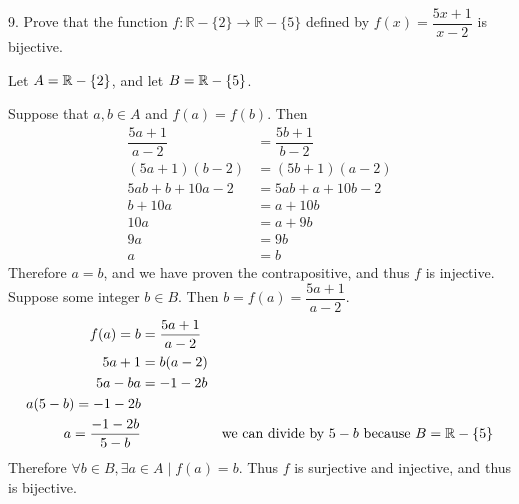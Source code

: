 \documentclass{idrisMemo}
\begin{document}
\begin{prooflist}{9. Prove that the function $f: \mathbb{R}-\{2\} \rightarrow
    \mathbb{R}-\{5\}$ defined by $f(x)=\dfrac{5 x+1}{x-2}$ is bijective.}
\inj{}
\item Let $A=\mathbb{R}-\{2\}$, and let $B=\mathbb{R}-\{5\}$.
\item Suppose that $a, b\in A$ and $f(a)=f(b)$. Then
    \begin{align*}
        \dfrac{5 a+1}{a-2}&=\dfrac{5 b+1}{b-2}\\
    (5 a+1)(b-2)&=(5 b+1)(a-2)\\
    5ab+b+10a-2&= 5ab+a+10b-2\\
    b+10a&= a+10b\\
    10a&= a+9b\\
    9a&= 9b\\
    a&=b
    \end{align*}
Therefore $a=b$, and we have proven the contrapositive, and thus $f$ is injective.
\surj{}
Suppose some integer $b\in B$. Then $b = f(a) = \dfrac{5a+1}{a-2}$.
    \begin{align*}
        f(a) = b &= \dfrac{5a+1}{a-2}\\
        5a+1 &= b(a-2)\\
        5a-ba &= -1-2b\\
        a(5-b)=-1-2b\\
        a=\dfrac{-1-2b}{5-b}&&\text{we can divide by }5-b\text{ because }
        B=\mathbb{R}-\{5\}\\
    \end{align*}
Therefore $\forall b\in B, \exists a \in A \mid f(a)=b$.  Thus $f$ is surjective
and injective, and thus is bijective.
\end{prooflist}
\end{document}
